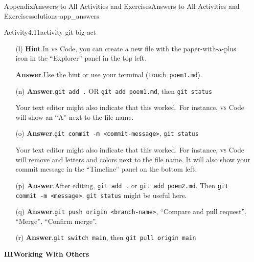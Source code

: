 \documentclass[twoside,10pt,]{book}
\newcommand{\blocktitlefont}{\relax}
\newcommand{\mono}[1]{\texttt{#1}}
\newcommand{\initialism}[1]{\textsc{\MakeLowercase{#1}}}
\begin{document}
\begin{solutions-chapter}{Appendix}{Answers to All Activities and Exercises}{}{Answers to All Activities and Exercises}{}{}{solutions-app_answers}
\begin{activitysolution}{Activity}{4.11}{}{activity-git-big-act}
\begin{enumerate}[font=\bfseries,label=(\alph*),ref=\alph*]
\par
Note that you could split up each poem into its own branch. Depending on the length of your poems, you may want to do that in practice but here we will edit both on one branch. That way you can practice two commits in one push!%
\item[(l)]\noindent\textbf{\blocktitlefont Hint}.\hypertarget{hint-git-big-act-m-b-back}{}\quad{}In \initialism{VS} Code, you can create a new file with the paper-with-a-plus icon in the ``Explorer'' panel in the top left.%
\par\smallskip%
\noindent\textbf{\blocktitlefont Answer}.\hypertarget{answer-git-big-act-m-c-back}{}\quad{}Use the hint or use your terminal (\mono{touch poem1.md}).%
\item[(n)]\noindent\textbf{\blocktitlefont Answer}.\hypertarget{answer-git-big-act-o-b-back}{}\quad{}\mono{git add .} OR \mono{git add poem1.md}, then \mono{git status}%
\par
Your text editor might also indicate that this worked. For instance, \initialism{VS} Code will show an ``A'' next to the file name.%
\item[(o)]\noindent\textbf{\blocktitlefont Answer}.\hypertarget{answer-git-big-act-p-b-back}{}\quad{}\mono{git commit -m \textquotedbl{}<commit-message>\textquotedbl{}}, \mono{git status}%
\par
Your text editor might also indicate that this worked. For instance, \initialism{VS} Code will remove and letters and colors next to the file name. It will also show your commit message in the ``Timeline'' panel on the bottom left.%
\item[(p)]\noindent\textbf{\blocktitlefont Answer}.\hypertarget{answer-git-big-act-q-b-back}{}\quad{}After editing, \mono{git add .} or \mono{git add poem2.md}. Then \mono{git commit -m \textquotedbl{}<message>\textquotedbl{}}. \mono{git status} might be useful here.%
\item[(q)]\noindent\textbf{\blocktitlefont Answer}.\hypertarget{answer-git-big-act-r-b-back}{}\quad{}\mono{git push origin <branch-name>}, ``Compare and pull request'', ``Merge'', ``Confirm merge''.%
\item[(r)]\noindent\textbf{\blocktitlefont Answer}.\hypertarget{answer-git-big-act-s-b-back}{}\quad{}\mono{git switch main}, then \mono{git pull origin main}%
\end{enumerate}%
\end{activitysolution}%
\par\medskip
\noindent\textbf{\Large{}III\space\textperiodcentered\space{}Working With Others\\
}
\end{solutions-chapter}
\end{document}
